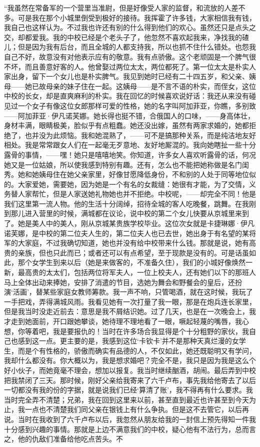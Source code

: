 \par “我虽然在常备军的一个营里当准尉，但是好像受人家的监督，和流放的人差不多。可是我在那个小城里倒受到极好的接待。我挥霍了许多钱，大家相信我有钱，我自己也这样认为。不过我也许还有别的什么得到他们的欢心。虽然还只是点头之交，却都爱我。我的中校已经是个老头子了，他忽然不喜欢起我来，净找我的碴儿；但是因为我有后台，而且全城的人都支持我，所以也抓不住什么错处。也怨我自己不好，故意没有对他表示应有的敬意。我有点骄傲。这个老顽固是一个脾气很不坏，而且善意好客的人。他曾娶过两位太太，两位都死了。第一位太太是朴实人家出身，留下一个女儿也是朴实脾气。我见到她时已经有二十四五岁，和父亲、姨母——她已故母亲的妹子住在一起。这姨母——是不言不语的朴实，而侄女，这位中校的长女，却是直爽麻利的朴实。我在回忆的时候喜欢说好话：我还从来没有碰见过一个女子有像这位女郎那样可爱的性格，她的名字叫阿加菲亚，你瞧，多别致——阿加菲亚·伊凡诺芙娜。她长得也挺不错，合俄国人的口味，——身高体壮，身材丰满，眼睛极美，脸似乎有点粗蠢。她还没出嫁，虽然有两家求婚的，她都拒绝了，也并没为此烦恼。我和她混熟了，——可不是搞那种关系，而是纯洁地友好相处。我是常常跟女人们在一起毫无歹意地、友好地厮混的。我向她瞎扯一些十分露骨的事情，——嘿！她只是嘻嘻地笑。你知道，许多女人喜欢听露骨的话，何况她又是一位姑娘，所以使我感到特别有趣。还有，怎么也不能把她称做是名门闺秀。她和她姨母住在她父亲家里，好像甘愿降低身份，不和别的人处于同等地位似的。大家爱她，需要她，因为她是一个有名的女裁缝：她很有才能，为了交情，义务替人家帮忙，但是人家送她礼物她也并不拒绝。中校呢，——却完全不同！他是我们这里第一流人物。他的生活十分阔绰，招待全城的客人吃晚餐，跳舞。在我刚到那儿进入营里的时候，满城都在议论，说中校的第二个女儿快要从京城里来到了。她是美人中的美人，刚从京城某贵族学校毕业。这位次女就是卡捷琳娜·伊凡诺芙娜，是中校的第二位夫人生的，第二位夫人也已去世，她出身于有名望的某将军的大家庭，不过我确切知道，她也并没有给中校带来什么钱。那就是说，她有高贵的亲族，但也只此而已；或者还可以有点希望，至于现款是没有的。可是话虽如此，那个女学生到来以后（她是来做客的，不准备久住），我们的小城好像焕然一新，最高贵的太太们，包括两位将军夫人，一位上校夫人，还有她们以下的那班人马上全体出动来捧她，安排了消遣的节目，选她为舞会和野餐会的皇后，还扮演‘活画’，替某些家庭女教师筹款。我一声不响，只管喝酒，就在这时候，我玩了一手把戏，弄得满城风雨。我看见她有一次打量了我一眼，那是在炮兵连长家里，但是我当时没走近前去：意思是我不屑结识她。过了几天，也是在一次晚会上，我才走到她面前，开口跟她攀谈，她待理不理地看了一眼，噘起轻蔑的嘴唇，我心想，你等着吧，我是要报仇的！当时在许多场合我显得是个十分粗野的家伙，我自己也感到这一点。更主要的是，我感到这位‘卡钦卡’并不是那种天真烂漫的女学生，而是个有性格的，骄傲而确实有品德的人，不仅如此，她还既聪明又有学问，我却什么都没有。你大概以为，我是想求婚吧？完全不是，我只是因为我是这么个好小伙子，而她竟毫不理会，想加以报复。我当时继续酗酒，胡闹。最后弄到中校把我禁闭了三天。那时候，刚好父亲给我寄来了六千卢布，事先我给他寄去了以后一切都没有我的份的字据，就是说我们已经‘算清了账’，我不得再有什么要求。我当时完全弄不清楚；兄弟，我在回到这里来以前，甚至直到最近也许甚至到今天为止，我一点也不清楚我们同父亲在银钱上有什么争执。但是这不去管它，以后再说。当时在我收到了六千卢布以后，我忽然从朋友给我的一封信上预先得知一件我十分感到兴趣的事情。那就是上边不满意我们的中校，疑心他有不法行为，总而言之，他的仇敌们准备给他吃点苦头。不